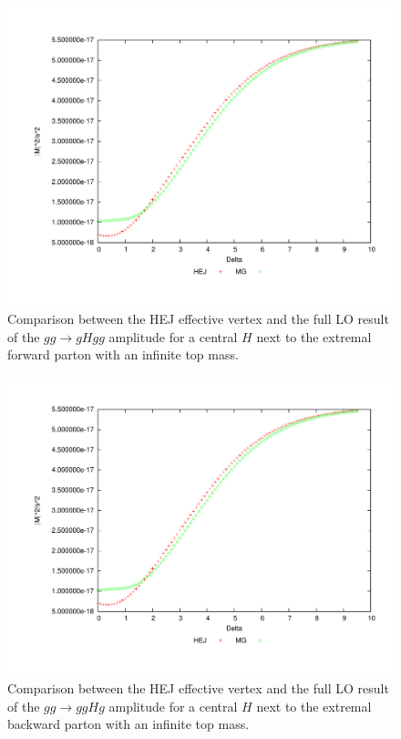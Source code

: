 \begin{figure}[H]
\centering
\includegraphics[scale=0.47]{Images/gg_cen1.pdf}
\caption{Comparison between the HEJ effective vertex and the full LO result of the $gg \to gHgg$ amplitude for a central $H$ next to the extremal forward parton with an infinite top mass.}
\label{fig:gg_ggh_2}
\end{figure}

\begin{figure}[H]
\centering
\includegraphics[scale=0.43]{Images/gg_cen2.pdf}
\caption{Comparison between the HEJ effective vertex and the full LO result of the $gg \to ggHg$ amplitude for a central $H$ next to the extremal backward parton with an infinite top mass.}
\label{fig:gg_ggh_3}
\end{figure}


